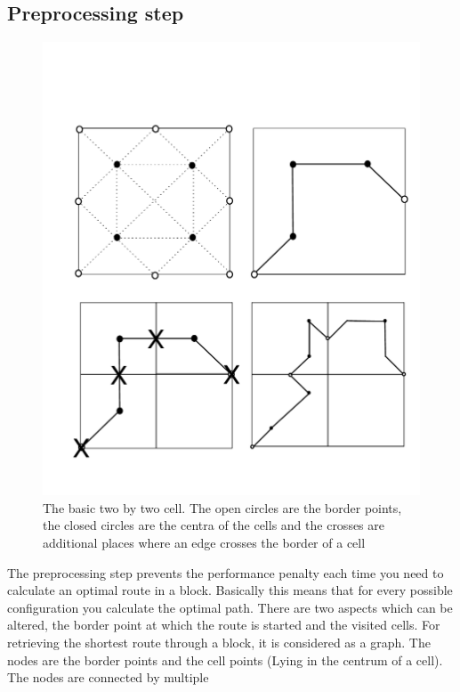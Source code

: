 \subsection{Preprocessing step}
\begin{figure}[t]
\begin{center}
\includegraphics[scale=0.25]{fig/renormalization.pdf}
\caption{The basic two by two cell. The open circles are the border points, the closed circles are the centra of the cells and the crosses are additional places where an edge crosses the border of a cell}
\label{fig:renormalization}
\end{center}
\end{figure}
The preprocessing step prevents the performance penalty each time you need to calculate an optimal route in a block. Basically this means that for every possible configuration you calculate the optimal path. There are two aspects which can be altered, the border point at which the route is started and the visited cells.
\newline\newline\noindent
For retrieving the shortest route through a block, it is considered as a graph. The nodes are the border points and the cell points (Lying in the centrum of a cell). The nodes are connected by multiple
